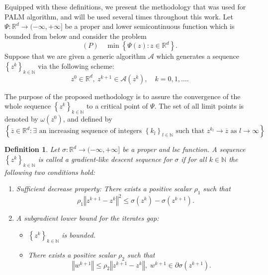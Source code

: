 \documentclass[12pt]{article}
\numberwithin{equation}{section}
\newtheorem{definition}{Definition}
\newcommand{\nn}{\mathbb{N}} %
\newcommand{\rr}{\mathbb{R}} %
\newcommand{\norm}[1]{\left\Vert {#1} \right\Vert} %
\begin{document}
Equipped with these definitions, we present the methodology that was used for PALM algorithm, and will be used several times throughout this work. Let $\Psi : \rr^d \rightarrow ( -\infty, +\infty ]$ be a proper and lower semicontinuous function which is bounded from below and consider the problem
\begin{equation*}
	(P) \quad \min \left\lbrace \Psi(z) : z \in \rr^d \right\rbrace .
\end{equation*} 
Suppose that we are given a generic algorithm $\mathcal{A}$ which generates a sequence $\left\lbrace z^k \right\rbrace_{k \in \mathbb{N}}$ via the following scheme:
\begin{equation*}
	z^0 \in \mathbb{R}^d, \: z^{k+1} \in \mathcal{A}\left(z^k\right), \quad k=0,1,\ldots.
\end{equation*}

The purpose of the proposed methodology is to assure the convergence of the whole sequence $\left\lbrace z^k \right\rbrace_{k \in \mathbb{N}}$ to a critical point of $\Psi$. The set of all limit points is denoted by $\omega\left(z^0\right)$, and defined by
\begin{equation*}
	\left\lbrace \overline{z} \in \rr^d : \exists \text{ an increasing sequence of integers } \left\lbrace k_l\right\rbrace_{l \in \nn} \text{ such that } z^{k_l} \rightarrow \overline{z} \text{ as } l \rightarrow \infty \right\rbrace .
\end{equation*}

\begin{definition}
	Let $\sigma: \rr^d \rightarrow (-\infty, +\infty]$ be a proper and lsc function. A sequence $\left\lbrace z^k \right\rbrace_{k \in \nn}$ is called \textit{a gradient-like descent sequence} for $\sigma$ if for all $k \in \nn$ the following two conditions hold:
	\begin{enumerate}[(C1)]
		\item \textit{Sufficient decrease property:} There exists a positive scalar $\rho_1$ such that
		\begin{equation*}
			\rho_1 \norm{z^{k+1} - z^k}^2 \leq \sigma\left( z^k \right) - \sigma \left( z^{k+1} \right) .
		\end{equation*}
		\item \textit{A subgradient lower bound for the iterates gap:}
		\begin{itemize}
			\item[$-$] $\left\lbrace z^k \right\rbrace_{k \in \nn}$ is bounded.
			\item[$-$] There exists a positive scalar $\rho_2$ such that
			\begin{equation*}
				\norm{w^{k+1}} \leq \rho_2 \norm{z^{k+1} - z^k}, \; w^{k+1} \in \partial\sigma \left( z^{k+1}\right).
			\end{equation*}
		\end{itemize}
	\end{enumerate}
\end{definition}
\end{document}
